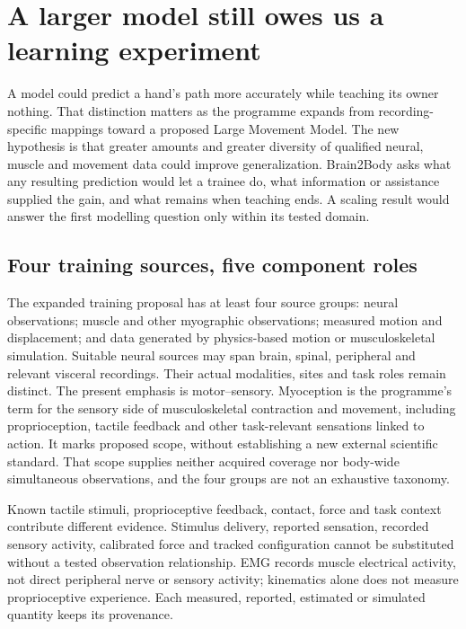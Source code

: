\section{A larger model still owes us a learning experiment}

A model could predict a hand's path more accurately while teaching its owner nothing. That distinction matters as the programme expands from recording-specific mappings toward a proposed Large Movement Model. The new hypothesis is that greater amounts and greater diversity of qualified neural, muscle and movement data could improve generalization. Brain2Body asks what any resulting prediction would let a trainee do, what information or assistance supplied the gain, and what remains when teaching ends. A scaling result would answer the first modelling question only within its tested domain.

\subsection{Four training sources, five component roles}

The expanded training proposal has at least four source groups: neural observations; muscle and other myographic observations; measured motion and displacement; and data generated by physics-based motion or musculoskeletal simulation. Suitable neural sources may span brain, spinal, peripheral and relevant visceral recordings. Their actual modalities, sites and task roles remain distinct. The present emphasis is motor--sensory. Myoception is the programme's term for the sensory side of musculoskeletal contraction and movement, including proprioception, tactile feedback and other task-relevant sensations linked to action. It marks proposed scope, without establishing a new external scientific standard. That scope supplies neither acquired coverage nor body-wide simultaneous observations, and the four groups are not an exhaustive taxonomy.

Known tactile stimuli, proprioceptive feedback, contact, force and task context contribute different evidence. Stimulus delivery, reported sensation, recorded sensory activity, calibrated force and tracked configuration cannot be substituted without a tested observation relationship. EMG records muscle electrical activity, not direct peripheral nerve or sensory activity; kinematics alone does not measure proprioceptive experience. Each measured, reported, estimated or simulated quantity keeps its provenance.

